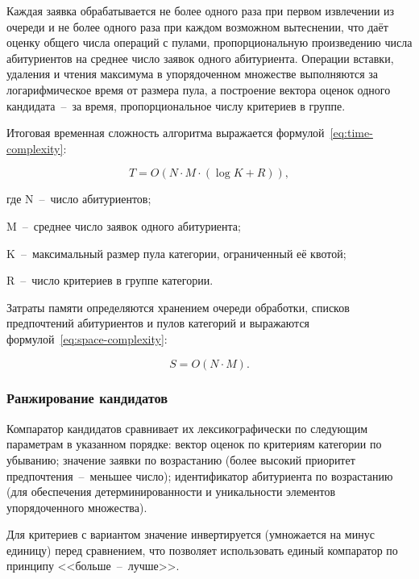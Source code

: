 Каждая заявка обрабатывается не более одного раза при первом извлечении из очереди и не более одного раза при каждом возможном вытеснении, что даёт оценку общего числа операций с пулами, пропорциональную произведению числа абитуриентов на среднее число заявок одного абитуриента.
Операции вставки, удаления и чтения максимума в упорядоченном множестве выполняются за логарифмическое время от размера пула, а построение вектора оценок одного кандидата~--~за время, пропорциональное числу критериев в группе.

Итоговая временная сложность алгоритма выражается формулой~\ref{eq:time-complexity}:

\begin{equation}
\label{eq:time-complexity}
T = O(N \cdot M \cdot (\log K + R)),
\end{equation}

\begin{explanationx}
\item где $\mathrm{N}$~--~число абитуриентов;
\item $\mathrm{M}$~--~среднее число заявок одного абитуриента;
\item $\mathrm{K}$~--~максимальный размер пула категории, ограниченный её квотой;
\item $\mathrm{R}$~--~число критериев в группе категории.
\end{explanationx}

Затраты памяти определяются хранением очереди обработки, списков предпочтений абитуриентов и пулов категорий и выражаются формулой~\ref{eq:space-complexity}:

\begin{equation}
\label{eq:space-complexity}
S = O(N \cdot M).
\end{equation}

\subsubsection{Ранжирование кандидатов}

Компаратор кандидатов сравнивает их лексикографически по следующим параметрам в указанном порядке: вектор оценок по критериям категории по убыванию; значение  заявки по возрастанию (более высокий приоритет предпочтения~--~меньшее число); идентификатор абитуриента по возрастанию (для обеспечения детерминированности и уникальности элементов упорядоченного множества).

Для критериев с вариантом  значение инвертируется (умножается на минус единицу) перед сравнением, что позволяет использовать единый компаратор по принципу <<больше~--~лучше>>.

